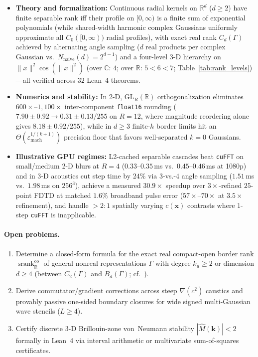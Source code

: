 \documentclass[11pt,a4paper]{article}
\theoremstyle{plain}
\theoremstyle{definition}
\newcommand{\R}{\mathbb{R}}
\newcommand{\C}{\mathbb{C}}
\newcommand{\Nnaive}{N_{\mathrm{naive}}}
\DeclareMathOperator{\srank}{srank}
\begin{document}
\begin{itemize}[leftmargin=1.8em,itemsep=3pt]
  \item \textbf{Theory and formalization:} Continuous radial kernels on $\R^d$ ($d \ge 2$) have finite separable rank iff their profile on $[0,\infty)$ is a finite sum of exponential polynomials (while shared-width harmonic complex Gaussians uniformly approximate all $C_0([0,\infty))$ radial profiles), with exact real rank $C_d(\Gamma)$ achieved by alternating angle sampling ($d$ real products per complex Gaussian vs.\ $\Nnaive(d) = 2^{d-1}$) and a four-level 3-D hierarchy on $\|x\|^2\cos(\|x\|^2)$ (over $\C$: $4$; over $\R$: $5 < 6 < 7$; Table~\ref{tab:rank_levels})---all verified across $32$ Lean~4 theorems.
  \item \textbf{Numerics and stability:} In 2-D, $\mathrm{GL}_R(\R)$ orthogonalization eliminates $600\times\text{--}1{,}100\times$ inter-component \texttt{float16} rounding ($7.90 \pm 0.92 \to 0.31 \pm 0.13/255$ on $R = 12$, where magnitude reordering alone gives $8.18 \pm 0.92/255$), while in $d \ge 3$ finite-$h$ border limits hit an $\Theta(\varepsilon_{\mathrm{mach}}^{1/(k+1)})$ precision floor that favors well-separated $k = 0$ Gaussians.
  \item \textbf{Illustrative GPU regimes:} L2-cached separable cascades beat \texttt{cuFFT} on small/medium 2-D blurs at $R = 4$ ($0.33\text{--}0.35$\,ms vs.\ $0.45\text{--}0.46$\,ms at 1080p) and in 3-D acoustics cut step time by $24\%$ via $3$-vs.-$4$ angle sampling ($1.51$\,ms vs.\ $1.98$\,ms on $256^3$), achieve a measured $30.9\times$ speedup over $3\times$-refined $25$-point FDTD at matched $1.6\%$ broadband pulse error ($57\times\text{--}70\times$ at $3.5\times$ refinement), and handle $> 2:1$ spatially varying $c(\mathbf{x})$ contrasts where $1$-step \texttt{cuFFT} is inapplicable.
\end{itemize}

\paragraph{Open problems.}
\begin{enumerate}[leftmargin=2em,itemsep=1pt]
  \item Determine a closed-form formula for the exact real compact-open border rank $\underline{\srank}_{\R}^{\mathrm{co}}$ of general nonreal representations $\Gamma$ with degree $k_u \ge 2$ or dimension $d \ge 4$ (between $C_2(\Gamma)$ and $B_d(\Gamma)$; cf.~\cite{zuiddam2017note,chang2026border}).
  \item Derive commutator/gradient corrections across steep $\nabla(c^2)$ caustics and provably passive one-sided boundary closures for wide signed multi-Gaussian wave stencils ($L \ge 4$).
  \item Certify discrete 3-D Brillouin-zone von~Neumann stability $|\widehat{M}(\mathbf{k})| < 2$ formally in Lean~4 via interval arithmetic or multivariate sum-of-squares certificates.
\end{enumerate}
\end{document}
